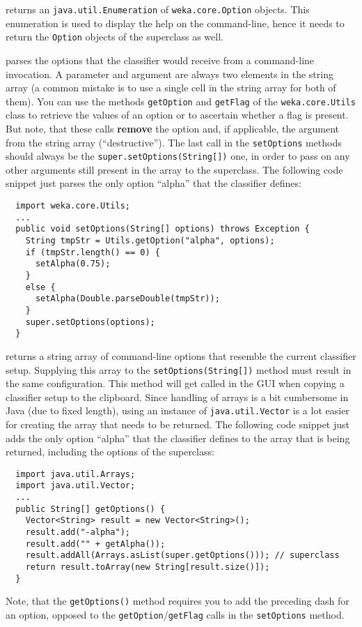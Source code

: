  returns an \texttt{java.util.Enumeration} of
\texttt{weka.core.Option} objects. This enumeration is used to display the help
on the command-line, hence it needs to return the \texttt{Option} objects of
the superclass as well.

 parses the options that the classifier
would receive from a command-line invocation. A parameter and argument are
always two elements in the string array (a common mistake is to use a single
cell in the string array for both of them). You can use the methods
\texttt{getOption} and \texttt{getFlag} of the \texttt{weka.core.Utils} class to
retrieve the values of an option or to ascertain whether a flag is present. But
note, that these calls \textbf{remove} the option and, if applicable, the
argument from the string array (``destructive''). The last call in the
\texttt{setOptions} methods should always be the
\texttt{super.setOptions(String[])} one, in order to pass on any other arguments
still present in the array to the superclass. The following code snippet just
parses the only option ``alpha'' that the classifier defines:
{\small \begin{verbatim}
  import weka.core.Utils;
  ...
  public void setOptions(String[] options) throws Exception {
    String tmpStr = Utils.getOption("alpha", options);
    if (tmpStr.length() == 0) {
      setAlpha(0.75);
    }
    else {
      setAlpha(Double.parseDouble(tmpStr));
    }
    super.setOptions(options);
  }
\end{verbatim}}

\clearpage

 returns a string array of command-line options that
resemble the current classifier setup. Supplying this array to the
\texttt{setOptions(String[])} method must result in the same configuration.
This method will get called in the GUI when copying a classifier setup to the
clipboard. Since handling of arrays is a bit cumbersome in Java (due to fixed
length), using an instance of \texttt{java.util.Vector} is a lot easier for
creating the array that needs to be returned. The following code snippet just
adds the only option ``alpha'' that the classifier defines to the array that is
being returned, including the options of the superclass:
\begin{verbatim}
  import java.util.Arrays;
  import java.util.Vector;
  ...
  public String[] getOptions() {
    Vector<String> result = new Vector<String>();
    result.add("-alpha");
    result.add("" + getAlpha());
    result.addAll(Arrays.asList(super.getOptions())); // superclass
    return result.toArray(new String[result.size()]);
  }
\end{verbatim}
Note, that the \texttt{getOptions()} method requires you to add the preceding
dash for an option, opposed to the \texttt{getOption}/\texttt{getFlag} calls in
the \texttt{setOptions} method.

